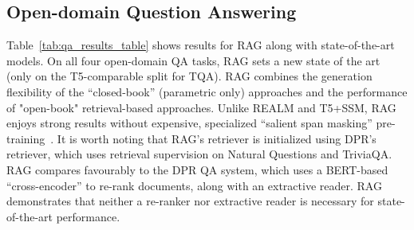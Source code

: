 \begin{table}[t]
\begin{minipage}[b]{0.49\linewidth}
    \label{tab:qa_results_table}
\end{minipage}
\hspace{0.01\linewidth}
\begin{minipage}[b]{0.49\linewidth}
\centering
  \caption{Generation and classification Test Scores.  MS-MARCO SotA is \cite{Bi2020PALMPA}, FEVER-3 is \cite{Zhong2019ReasoningOS} and FEVER-2 is \cite{Thorne2020AvoidingCF} *Uses gold context/evidence. Best model without gold access underlined. 
    }
    \vspace{13pt}
 \small
    \addtolength{\tabcolsep}{-3pt}   
    \addtolength{\tabcolsep}{3pt}    

    \label{tab:generations}
    \end{minipage}
\end{table}












\subsection{Open-domain Question Answering}

Table~\ref{tab:qa_results_table} shows results for RAG along with state-of-the-art models. On all four open-domain QA tasks, RAG sets a new state of the art 
(only on the T5-comparable split for TQA).
RAG combines the generation flexibility of the ``closed-book'' (parametric only) approaches and the performance of "open-book" retrieval-based approaches. 
Unlike REALM and T5+SSM, RAG enjoys strong results without expensive, specialized ``salient span masking'' pre-training~\cite{guu2020realm}.
It is worth noting that RAG's retriever is initialized using DPR's retriever, which uses retrieval supervision on Natural Questions and TriviaQA.
RAG compares favourably to the DPR QA system, which uses a BERT-based ``cross-encoder'' to re-rank documents, along with an extractive reader. RAG demonstrates that neither a re-ranker nor extractive reader is necessary for state-of-the-art performance. 

